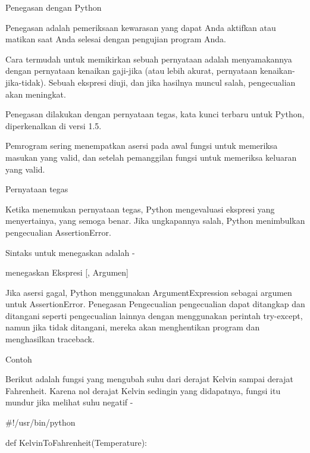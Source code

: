 \vspace{12pt}
Penegasan dengan Python \par
\vspace{12pt}
Penegasan adalah pemeriksaan kewarasan yang dapat Anda aktifkan atau matikan saat Anda selesai dengan pengujian program Anda. \par
\vspace{12pt}
Cara termudah untuk memikirkan sebuah pernyataan adalah menyamakannya dengan pernyataan kenaikan gaji-jika (atau lebih akurat, pernyataan kenaikan-jika-tidak). Sebuah ekspresi diuji, dan jika hasilnya muncul salah, pengecualian akan meningkat. \par
\vspace{12pt}
Penegasan dilakukan dengan pernyataan tegas, kata kunci terbaru untuk Python, diperkenalkan di versi 1.5. \par
\vspace{12pt}
Pemrogram sering menempatkan asersi pada awal fungsi untuk memeriksa masukan yang valid, dan setelah pemanggilan fungsi untuk memeriksa keluaran yang valid. \par
Pernyataan tegas \par
\vspace{12pt}
Ketika menemukan pernyataan tegas, Python mengevaluasi ekspresi yang menyertainya, yang semoga benar. Jika ungkapannya salah, Python menimbulkan pengecualian AssertionError. \par
\vspace{12pt}
Sintaks untuk menegaskan adalah - \par
\vspace{12pt}
menegaskan Ekspresi [, Argumen] \par
\vspace{12pt}
Jika asersi gagal, Python menggunakan ArgumentExpression sebagai argumen untuk AssertionError. Penegasan Pengecualian pengecualian dapat ditangkap dan ditangani seperti pengecualian lainnya dengan menggunakan perintah try-except, namun jika tidak ditangani, mereka akan menghentikan program dan menghasilkan traceback. \par
Contoh \par
\vspace{12pt}
Berikut adalah fungsi yang mengubah suhu dari derajat Kelvin sampai derajat Fahrenheit. Karena nol derajat Kelvin sedingin yang didapatnya, fungsi itu mundur jika melihat suhu negatif - \par
 $  \#  $!/usr/bin/python \par
def KelvinToFahrenheit(Temperature): \par
